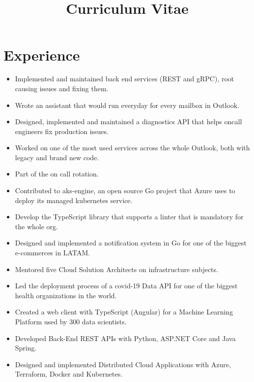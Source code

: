 \documentclass[10pt, a4paper, roman]{moderncv} %
\title{Curriculum Vitae}
\begin{document}
\makecvtitle %

\section{Experience}

{
    \begin{itemize}
        \item Implemented and maintained back end services (REST and gRPC), root causing issues and fixing them.
        \item Wrote an assistant that would run everyday for every mailbox in Outlook.
        \item Designed, implemented and maintained a diagnostics API that helps oncall engineers fix production issues.
        \item Worked on one of the most used services across the whole Outlook, both with legacy and brand new code.
        \item Part of the on call rotation.
    \end{itemize}
}

{
    \begin{itemize}
	    \item Contributed to aks-engine, an open source Go project that Azure uses to deploy its managed kubernetes service. 
	    \item Develop the TypeScript library that supports a linter that is mandatory for the whole org.
        \item Designed and implemented a notification system in Go for one of the biggest e-commerces in LATAM.
        \item Mentored five Cloud Solution Architects on infrastructure subjects.
        \item Led the deployment process of a covid-19 Data API for one of the biggest health organizations in the world.
    \end{itemize}
}

{
    \begin{itemize}
        \item Created a web client with TypeScript (Angular) for a Machine Learning Platform used by 300 data scientists.
        \item Developed Back-End REST APIs with Python, ASP.NET Core and Java Spring.
	    \item Designed and implemented Distributed Cloud Applications with Azure, Terraform, Docker and Kubernetes.
    \end{itemize}
}
\end{document}
